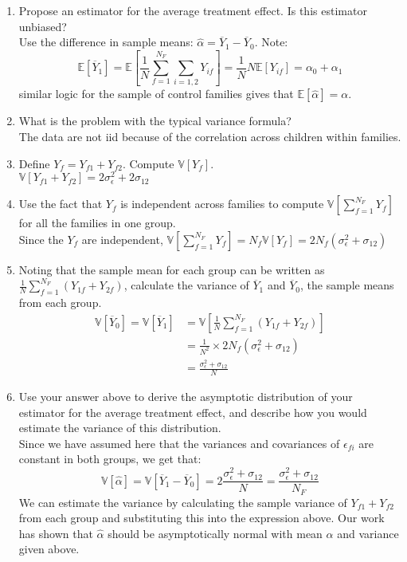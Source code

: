 \documentclass[12pt]{article}
\newcommand\ov{\overline}
\newcommand\BB{\mathbb}
\newcommand\EE{\mathbb{E}}
\newcommand\h{\hat}
\newcommand\eps{\epsilon}
\numberwithin{equation}{section}
\numberwithin{figure}{section}
\numberwithin{table}{section}
\begin{document}
\begin{enumerate}
\item Propose an estimator for the average treatment effect. Is this estimator unbiased? \\
  {\color{blue} Use the difference in sample means: $\h{\alpha}=\ov{Y}_1-\ov{Y}_0$. Note:
    \[\EE[\ov{Y}_1] = \EE[\frac{1}{N}\sum_{f=1}^{N_F}\sum_{i=1,2}Y_{if}] = \frac{1}{N}N\EE[Y_{if}] = \alpha_0+\alpha_1 \]
    similar logic for the sample of control families gives that $\EE[\h{\alpha}] = \alpha$.}
\item What is the problem with the typical variance formula? \\
  {\color{blue} The data are not iid because of the correlation across children within families.}
\item Define $Y_f = Y_{f1}+Y_{f2}$. Compute $\BB{V}[Y_f]$. \\
  {\color{blue} $\BB{V}[Y_{f1}+Y_{f2}] = 2\sigma^2_\eps + 2\sigma_{12}$}
\item Use the fact that $Y_f$ is independent across families to compute $\BB{V}[\sum_{f=1}^{N_F}Y_f]$ for all the families in one group. \\
  {\color{blue} Since the $Y_f$ are independent, $\BB{V}[\sum_{f=1}^{N_F}Y_f] = N_f\BB{V}[Y_f] = 2N_f(\sigma^2_\eps +\sigma_{12})$}
\item Noting that the sample mean for each group can be written as $\frac{1}{N}\sum_{f=1}^{N_F}(Y_{1f} + Y_{2f})$, calculate the variance of $\ov{Y}_1$ and $\ov{Y}_0$, the sample means from each group.
  {\color{blue}
    \begin{align*}
     \BB{V}[\ov{Y}_0]= \BB{V}[\ov{Y}_1] &= \BB{V}\left[\frac{1}{N}\sum_{f=1}^{N_F}(Y_{1f} + Y_{2f})\right] \\
                       &= \frac{1}{N^2}\times 2N_f(\sigma^2_\eps+\sigma_{12}) \\
                       &= \frac{\sigma^2_\eps+\sigma_{12}}{N}
    \end{align*}}
\item Use your answer above to derive the asymptotic distribution of your estimator for the average treatment effect, and describe how you would estimate the variance of this distribution. \\
  {\color{blue}
    Since we have assumed here that the variances and covariances of $\eps_{fi}$ are constant in both groups, we get that:
    \[\BB{V}[\h{\alpha}] = \BB{V}[\ov{Y}_1-\ov{Y}_0] = 2\frac{\sigma^2_\eps+\sigma_{12}}{N} = \frac{\sigma^2_\eps+\sigma_{12}}{N_F} \]
We can estimate the variance by calculating the sample variance of $Y_{f1}+Y_{f2}$ from each group and substituting this into the expression above. Our work has shown that $\hat{\alpha}$ should be asymptotically normal with mean $\alpha$ and variance given above.
}
\end{enumerate}
\end{document}
